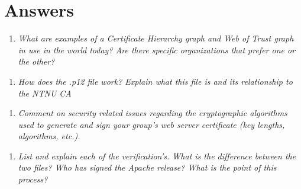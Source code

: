 %
%
%
%
%

\section{Answers}

\begin{enumerate} 
    \item \itshape What are examples of a Certificate Hierarchy graph and Web of Trust graph in use in
          the world today? Are there specific organizations that prefer one or the other?
\end{enumerate}




\begin{enumerate}[resume]
    \item \itshape How does the .p12 file work? Explain what this file is and its relationship to the 
          \textnormal{NTNU CA}
\end{enumerate}




\begin{enumerate}[resume]
    \item \itshape Comment on security related issues regarding the cryptographic algorithms used to
          generate and sign your group’s web server certificate (key lengths, algorithms, etc.).
\end{enumerate}




\begin{enumerate}[resume]
    \item \itshape List and explain each of the verification's. What is the difference between the two files?
Who has signed the Apache release? What is the point of this process?
\end{enumerate}



